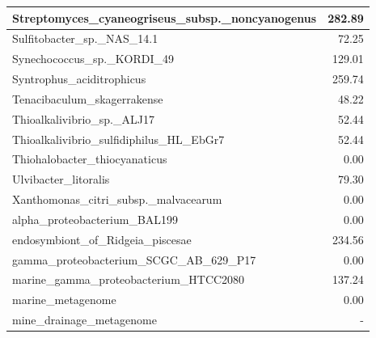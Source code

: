 \documentclass[12pt,a4paper]{article}
\begin{document}
\begin{table}[ht]
\begin{center}
\begin{tabular}{|l*{1}{|r}|}
Streptomyces\_cyaneogriseus\_subsp.\_noncyanogenus & 282.89 \\ \hline
Sulfitobacter\_sp.\_NAS\_14.1 & 72.25 \\ \hline
Synechococcus\_sp.\_KORDI\_49 & 129.01 \\ \hline
Syntrophus\_aciditrophicus & 259.74 \\ \hline
Tenacibaculum\_skagerrakense & 48.22 \\ \hline
Thioalkalivibrio\_sp.\_ALJ17 & 52.44 \\ \hline
Thioalkalivibrio\_sulfidiphilus\_HL\_EbGr7 & 52.44 \\ \hline
Thiohalobacter\_thiocyanaticus & 0.00 \\ \hline
Ulvibacter\_litoralis & 79.30 \\ \hline
Xanthomonas\_citri\_subsp.\_malvacearum & 0.00 \\ \hline
alpha\_proteobacterium\_BAL199 & 0.00 \\ \hline
endosymbiont\_of\_Ridgeia\_piscesae & 234.56 \\ \hline
gamma\_proteobacterium\_SCGC\_AB\_629\_P17 & 0.00 \\ \hline
marine\_gamma\_proteobacterium\_HTCC2080 & 137.24 \\ \hline
marine\_metagenome & 0.00 \\ \hline
mine\_drainage\_metagenome & - \\ \hline
\end{tabular}
\end{center}
\end{table}
\end{document}
